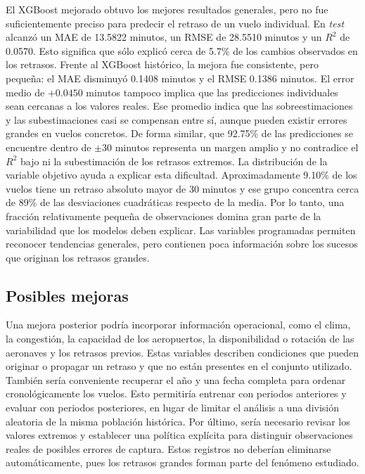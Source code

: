\documentclass[a4paper,12pt,twocolumn]{report}
\begin{document}
El XGBoost mejorado obtuvo los mejores resultados generales, pero no fue suficientemente preciso para predecir el retraso de un vuelo individual. En \textit{test} alcanzó un MAE de 13.5822 minutos, un RMSE de 28.5510 minutos y un $R^2$ de 0.0570. Esto significa que sólo explicó cerca de 5.7\% de los cambios observados en los retrasos. Frente al XGBoost histórico, la mejora fue consistente, pero pequeña: el MAE disminuyó 0.1408 minutos y el RMSE 0.1386 minutos.
\newline
El error medio de $+0.0450$ minutos tampoco implica que las predicciones individuales sean cercanas a los valores reales. Ese promedio indica que las sobreestimaciones y las subestimaciones casi se compensan entre sí, aunque pueden existir errores grandes en vuelos concretos. De forma similar, que 92.75\% de las predicciones se encuentre dentro de $\pm30$ minutos representa un margen amplio y no contradice el $R^2$ bajo ni la subestimación de los retrasos extremos.
\newline
La distribución de la variable objetivo ayuda a explicar esta dificultad. Aproximadamente 9.10\% de los vuelos tiene un retraso absoluto mayor de 30 minutos y ese grupo concentra cerca de 89\% de las desviaciones cuadráticas respecto de la media. Por lo tanto, una fracción relativamente pequeña de observaciones domina gran parte de la variabilidad que los modelos deben explicar. Las variables programadas permiten reconocer tendencias generales, pero contienen poca información sobre los sucesos que originan los retrasos grandes.

\subsection{Posibles mejoras}

Una mejora posterior podría incorporar información operacional, como el clima, la congestión, la capacidad de los aeropuertos, la disponibilidad o rotación de las aeronaves y los retrasos previos. Estas variables describen condiciones que pueden originar o propagar un retraso y que no están presentes en el conjunto utilizado.
\newline
También sería conveniente recuperar el año y una fecha completa para ordenar cronológicamente los vuelos. Esto permitiría entrenar con periodos anteriores y evaluar con periodos posteriores, en lugar de limitar el análisis a una división aleatoria de la misma población histórica.
\newline
Por último, sería necesario revisar los valores extremos y establecer una política explícita para distinguir observaciones reales de posibles errores de captura. Estos registros no deberían eliminarse automáticamente, pues los retrasos grandes forman parte del fenómeno estudiado.
\end{document}
